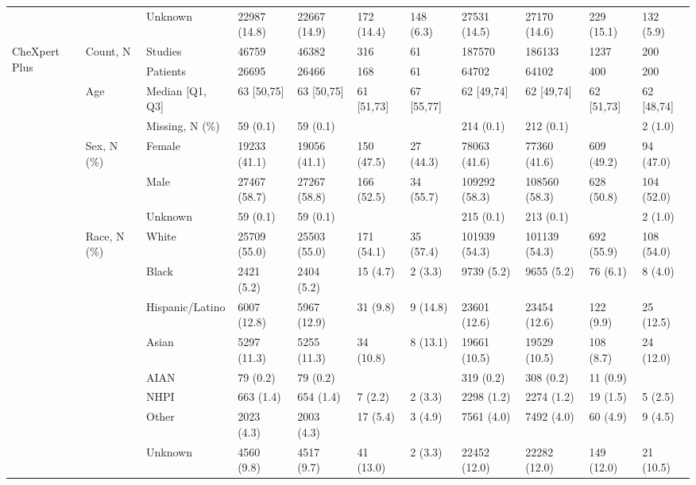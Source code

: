 \begin{tabular}{lllllllllll}
 &  & Unknown & 22987 (14.8) & 22667 (14.9) & 172 (14.4) & 148 (6.3) & 27531 (14.5) & 27170 (14.6) & 229 (15.1) & 132 (5.9) \\
\cmidrule(lr){1-11} \cmidrule(lr){2-11}
\multirow[c]{15}{*}{CheXpert Plus} & \multirow[c]{2}{*}{Count, N} & Studies & 46759 & 46382 & 316 & 61 & 187570 & 186133 & 1237 & 200 \\
 &  & Patients & 26695 & 26466 & 168 & 61 & 64702 & 64102 & 400 & 200 \\
\cmidrule(lr){2-11}
 & \multirow[c]{2}{*}{Age} & Median [Q1, Q3] & 63 [50,75] & 63 [50,75] & 61 [51,73] & 67 [55,77] & 62 [49,74] & 62 [49,74] & 62 [51,73] & 62 [48,74] \\
 &  & Missing, N (\%) & 59 (0.1) & 59 (0.1) &  &  & 214 (0.1) & 212 (0.1) &  & 2 (1.0) \\
\cmidrule(lr){2-11}
 & \multirow[c]{3}{*}{Sex, N (\%)} & Female & 19233 (41.1) & 19056 (41.1) & 150 (47.5) & 27 (44.3) & 78063 (41.6) & 77360 (41.6) & 609 (49.2) & 94 (47.0) \\
 &  & Male & 27467 (58.7) & 27267 (58.8) & 166 (52.5) & 34 (55.7) & 109292 (58.3) & 108560 (58.3) & 628 (50.8) & 104 (52.0) \\
 &  & Unknown & 59 (0.1) & 59 (0.1) &  &  & 215 (0.1) & 213 (0.1) &  & 2 (1.0) \\
\cmidrule(lr){2-11}
 & \multirow[c]{8}{*}{Race, N (\%)} & White & 25709 (55.0) & 25503 (55.0) & 171 (54.1) & 35 (57.4) & 101939 (54.3) & 101139 (54.3) & 692 (55.9) & 108 (54.0) \\
 &  & Black & 2421 (5.2) & 2404 (5.2) & 15 (4.7) & 2 (3.3) & 9739 (5.2) & 9655 (5.2) & 76 (6.1) & 8 (4.0) \\
 &  & Hispanic/Latino & 6007 (12.8) & 5967 (12.9) & 31 (9.8) & 9 (14.8) & 23601 (12.6) & 23454 (12.6) & 122 (9.9) & 25 (12.5) \\
 &  & Asian & 5297 (11.3) & 5255 (11.3) & 34 (10.8) & 8 (13.1) & 19661 (10.5) & 19529 (10.5) & 108 (8.7) & 24 (12.0) \\
 &  & AIAN & 79 (0.2) & 79 (0.2) &  &  & 319 (0.2) & 308 (0.2) & 11 (0.9) &  \\
 &  & NHPI & 663 (1.4) & 654 (1.4) & 7 (2.2) & 2 (3.3) & 2298 (1.2) & 2274 (1.2) & 19 (1.5) & 5 (2.5) \\
 &  & Other & 2023 (4.3) & 2003 (4.3) & 17 (5.4) & 3 (4.9) & 7561 (4.0) & 7492 (4.0) & 60 (4.9) & 9 (4.5) \\
 &  & Unknown & 4560 (9.8) & 4517 (9.7) & 41 (13.0) & 2 (3.3) & 22452 (12.0) & 22282 (12.0) & 149 (12.0) & 21 (10.5) \\
\cmidrule(lr){1-11} \cmidrule(lr){2-11}
\bottomrule
\end{tabular}
